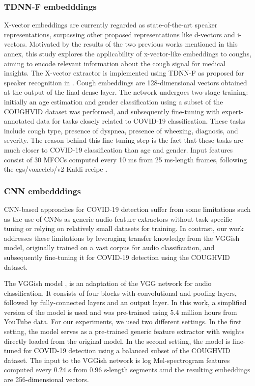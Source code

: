\subsubsection{TDNN-F embedddings}
X-vector embeddings are currently regarded as state-of-the-art speaker representations, surpassing other proposed representations like d-vectors and i-vectors. Motivated by the results of the two previous works mentioned in this annex, this study explores the applicability of x-vector-like embeddings to coughs, aiming to encode relevant information about the cough signal for medical insights.
The X-vector extractor is implemented using TDNN-F as proposed for speaker recognition in \cite{villalbaSRE182020}.  Cough embeddings are 128-dimensional vectors obtained at the output of the final dense layer. The network undergoes two-stage training: initially an age estimation and gender classification using a subset of the COUGHVID dataset was performed, and subsequently fine-tuning with expert-annotated data for tasks closely related to COVID-19 classification. These tasks include cough type, presence of dyspnea, presence of wheezing, diagnosis, and severity. The reason behind this fine-tuning step is the fact that these tasks are much closer to COVID-19 classification than age and gender. Input features consist of 30 MFCCs computed every 10 ms from 25 ms-length frames, following the egs/voxceleb/v2 Kaldi recipe \cite{kaldi}.

\subsubsection{CNN embedddings}
CNN-based approaches for COVID-19 detection suffer from some limitations such as the use of CNNs as generic audio feature extractors without task-specific tuning or relying on relatively small datasets for training. In contrast, our work addresses these limitations by leveraging transfer knowledge from the VGGish model, originally trained on a vast corpus for audio classification, and subsequently fine-tuning it for COVID-19 detection using the COUGHVID dataset.

The VGGish model \cite{Hershey2017},  is an adaptation of the VGG network \cite{Simonyan2015} for audio classification. It consists of four blocks with convolutional and pooling layers, followed by fully-connected layers and an output layer. In this work, a simplified version of the model is used and was pre-trained using 5.4 million hours from YouTube data. For our experiments, we used two different settings. In the first setting, the model serves as a pre-trained generic feature extractor with weights directly loaded from the original model. In the second setting, the model is fine-tuned for COVID-19 detection using a balanced subset of the COUGHVID dataset. The input to the VGGish network is log Mel-spectrogram features computed every 0.24 s from 0.96 s-length segments amd the resulting embeddings are 256-dimensional vectors.

